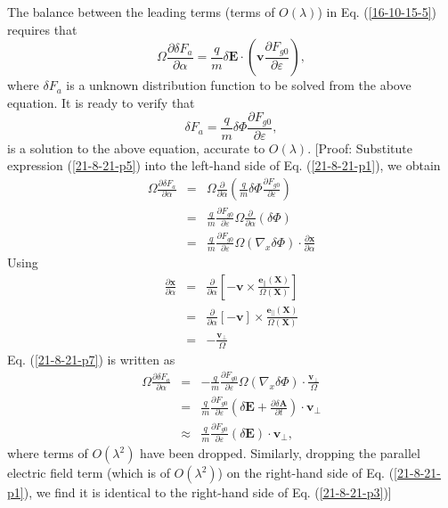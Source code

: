\documentclass{article}
\newcommand{\tmmathbf}[1]{\ensuremath{\boldsymbol{#1}}}
\begin{document}
The balance between the leading terms (terms of $O (\lambda)$) in Eq.
(\ref{16-10-15-5}) requires that
\begin{equation}
  \label{21-8-21-p1} \Omega \frac{\partial \delta F_a}{\partial \alpha} =
  \frac{q}{m} \delta \mathbf{E} \cdot \left( \mathbf{v} \frac{\partial F_{g
  0}}{\partial \varepsilon} \right),
\end{equation}
where $\delta F_a$ is a unknown distribution function to be solved from the
above equation. It is ready to verify that
\begin{equation}
  \label{21-8-21-p5} \delta F_a = \frac{q}{m} \delta \Phi \frac{\partial F_{g
  0}}{\partial \varepsilon},
\end{equation}
is a solution to the above equation, accurate to $O (\lambda)$. [Proof:
Substitute expression (\ref{21-8-21-p5}) into the left-hand side of Eq.
(\ref{21-8-21-p1}), we obtain
\begin{eqnarray}
  \Omega \frac{\partial \delta F_a}{\partial \alpha} & = & \Omega
  \frac{\partial}{\partial \alpha} \left( \frac{q}{m} \delta \Phi
  \frac{\partial F_{g 0}}{\partial \varepsilon} \right) \nonumber\\
  & = & \frac{q}{m} \frac{\partial F_{g 0}}{\partial \varepsilon} \Omega
  \frac{\partial}{\partial \alpha} (\delta \Phi) \nonumber\\
  & = & \frac{q}{m} \frac{\partial F_{g 0}}{\partial \varepsilon} \Omega
  (\nabla_x \delta \Phi) \cdot \frac{\partial \mathbf{x}}{\partial \alpha} 
  \label{21-8-21-p7}
\end{eqnarray}
Using
\begin{eqnarray}
  \frac{\partial \mathbf{x}}{\partial \alpha} & = & \frac{\partial
  \textbf{}}{\partial \alpha} \left[ -\mathbf{v} \times
  \frac{\tmmathbf{e}_{\parallel} (\mathbf{X})}{\Omega (\mathbf{X})} \right]
  \nonumber\\
  & = & \frac{\partial \textbf{}}{\partial \alpha} [-\mathbf{v}] \times
  \frac{\tmmathbf{e}_{\parallel} (\mathbf{X})}{\Omega (\mathbf{X})}
  \nonumber\\
  & = & - \frac{\mathbf{v}_{\perp}}{\Omega} 
\end{eqnarray}
Eq. (\ref{21-8-21-p7}) is written as
\begin{eqnarray}
  \Omega \frac{\partial \delta F_a}{\partial \alpha} & = & - \frac{q}{m}
  \frac{\partial F_{g 0}}{\partial \varepsilon} \Omega (\nabla_x \delta \Phi)
  \cdot \frac{\mathbf{v}_{\perp}}{\Omega} \nonumber\\
  & = & \frac{q}{m} \frac{\partial F_{g 0}}{\partial \varepsilon} \left(
  \delta \mathbf{E}+ \frac{\partial \delta \mathbf{A}}{\partial t} \right)
  \cdot \mathbf{v}_{\perp} \\
  & \approx & \frac{q}{m} \frac{\partial F_{g 0}}{\partial \varepsilon}
  (\delta \mathbf{E}) \cdot \mathbf{v}_{\perp},  \label{21-8-21-p3}
\end{eqnarray}
where terms of $O (\lambda^2)$ have been dropped. Similarly, dropping the
parallel electric field term (which is of $O (\lambda^2)$) on the right-hand
side of Eq. (\ref{21-8-21-p1}), we find it is identical to the right-hand side
of Eq. (\ref{21-8-21-p3})]
\end{document}
